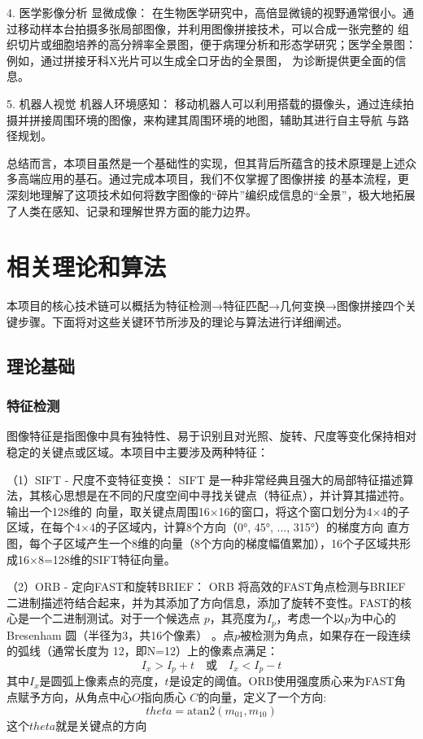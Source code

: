 \documentclass[12pt,a4paper]{article}     %
\begin{document}
4. 医学影像分析
显微成像： 在生物医学研究中，高倍显微镜的视野通常很小。通过移动样本台拍摄多张局部图像，并利用图像拼接技术，可以合成一张完整的
组织切片或细胞培养的高分辨率全景图，便于病理分析和形态学研究；医学全景图： 例如，通过拼接牙科X光片可以生成全口牙齿的全景图，
为诊断提供更全面的信息。

5. 机器人视觉
机器人环境感知： 移动机器人可以利用搭载的摄像头，通过连续拍摄并拼接周围环境的图像，来构建其周围环境的地图，辅助其进行自主导航
与路径规划。

总结而言，本项目虽然是一个基础性的实现，但其背后所蕴含的技术原理是上述众多高端应用的基石。通过完成本项目，我们不仅掌握了图像拼接
的基本流程，更深刻地理解了这项技术如何将数字图像的“碎片”编织成信息的“全景”，极大地拓展了人类在感知、记录和理解世界方面的能力边界。

\section{相关理论和算法}
本项目的核心技术链可以概括为特征检测→特征匹配→几何变换→图像拼接四个关键步骤。下面将对这些关键环节所涉及的理论与算法进行详细阐述。

\subsection{理论基础}
\subsubsection{特征检测}
图像特征是指图像中具有独特性、易于识别且对光照、旋转、尺度等变化保持相对稳定的关键点或区域。本项目中主要涉及两种特征：

（1）SIFT - 尺度不变特征变换：
SIFT 是一种非常经典且强大的局部特征描述算法，其核心思想是在不同的尺度空间中寻找关键点（特征点），并计算其描述符。输出一个128维的
向量，取关键点周围16×16的窗口，将这个窗口划分为4×4的子区域，在每个4×4的子区域内，计算8个方向（0°, 45°, ..., 315°）的梯度方向
直方图，每个子区域产生一个8维的向量（8个方向的梯度幅值累加），16个子区域共形成16×8=128维的SIFT特征向量。

（2）ORB - 定向FAST和旋转BRIEF：
ORB 将高效的FAST角点检测与BRIEF二进制描述符结合起来，并为其添加了方向信息，添加了旋转不变性。FAST的核心是一个二进制测试。对于一个候选点 
$p$，其亮度为$I_p$，考虑一个以$p$为中心的 Bresenham 圆（半径为3，共16个像素） 。点$p$被检测为角点，如果存在一段连续的弧线（通常长度为
12，即N=12）上的像素点满足：
\[
I_x > I_p + t \quad \text{或} \quad I_x < I_p - t
\]
其中$I_x$是圆弧上像素点的亮度，$t$是设定的阈值。ORB使用强度质心来为FAST角点赋予方向，从角点中心$O$指向质心 $C$的向量，定义了一个方向:
\[
theta = \text{atan2}(m_{01}, m_{10})
\]
这个$theta$就是关键点的方向
\end{document}
